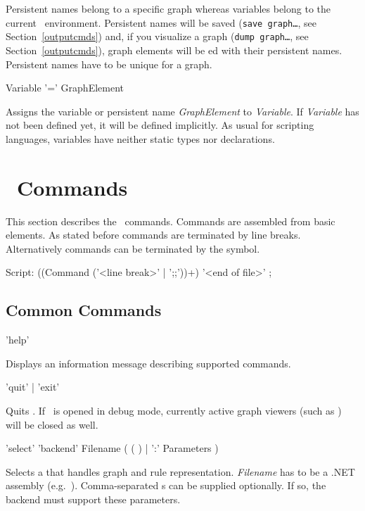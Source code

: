 \begin{note}
Persistent names belong to a specific graph whereas variables belong to the current \GrShell\ environment. Persistent names will be saved (\texttt{save graph\dots}, see Section~\ref{outputcmds}) and, if you visualize a graph (\texttt{dump graph\dots}, see Section~\ref{outputcmds}), graph elements will be ed with their persistent names. Persistent names have to be unique for a graph.
\end{note}

\begin{rail}
  Variable '=' GraphElement   
\end{rail}
Assigns the variable or persistent name \emph{GraphElement} to \emph{Variable}. If \emph{Variable} has not been defined yet, it will be defined implicitly. As usual for scripting languages, variables have neither static types nor declarations.

\section{\GrShell\ Commands}
This section describes the \GrShell\ commands. Commands are assembled from basic elements. As stated before commands are terminated by line breaks. Alternatively commands can be terminated by the \indexed{\texttt{;;}} symbol.
\begin{rail}
  Script: ((Command ('<line break>' | ';;'))+) '<end of file>' ;
\end{rail}

\subsection{Common Commands}
\label{commcommands}
\begin{rail}
  'help'
\end{rail}
Displays an information message describing supported commands. 

\begin{rail}
  'quit' | 'exit'
\end{rail}
Quits \GrShell. If \GrShell\ is opened in debug mode, currently active graph viewers (such as \yComp) will be closed as well.

\begin{rail}
  'select' 'backend' Filename ( ( ) | ':' Parameters )
\end{rail}
Selects a  that handles graph and rule representation. \emph{Filename} has to be a .NET assembly (e.g.\ \texttt{}).
Comma-separated s can be supplied optionally. If so, the backend must support these parameters.


